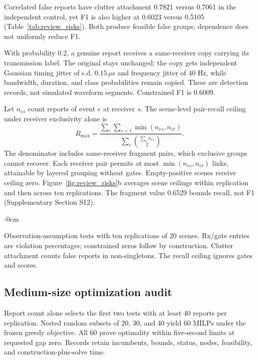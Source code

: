 Correlated false reports have clutter attachment 0.7821 versus 0.7061 in the independent control, yet F1 is also higher at 0.6023 versus 0.5105 (Table~\ref{tab:review_risks}). Both produce feasible false groups; dependence does not uniformly reduce F1.

With probability 0.2, a genuine report receives a same-receiver copy carrying its transmission label. The original stays unchanged; the copy gets independent Gaussian timing jitter of s.d. $0.15\,\mu$s and frequency jitter of 40 Hz, while bandwidth, duration, and class probabilities remain copied. These are detection records, not simulated waveform segments. Constrained F1 is 0.6009.

Let $n_{es}$ count reports of event $e$ at receiver $s$. The scene-level pair-recall ceiling under receiver exclusivity alone is
\[
 R_{\max}=\frac{\sum_e\sum_{s<t}\min(n_{es},n_{et})}
 {\sum_e\binom{\sum_s n_{es}}2}.
\]
The denominator includes same-receiver fragment pairs, which exclusive groups cannot recover. Each receiver pair permits at most $\min(n_{es},n_{et})$ links, attainable by layered grouping without gates. Empty-positive scenes receive ceiling zero. Figure~\ref{fig:review_risks}b averages scene ceilings within replication and then across ten replications. The fragment value 0.6529 bounds recall, not F1 (Supplementary Section S12).

\begin{table}[!t]\begin{adjustwidth}{-\extralength}{0cm}
\caption{Observation-assumption tests with ten replications of 20 scenes. Rx/gate entries are violation percentages; constrained zeros follow by construction. Clutter attachment counts false reports in non-singletons. The recall ceiling ignores gates and scores.}\label{tab:review_risks}
\small\setlength{\tabcolsep}{3pt}
\end{adjustwidth}\end{table}

\subsection{Medium-size optimization audit}\label{sec:medium_exact}
Report count alone selects the first two tests with at least 40 reports per replication. Nested random subsets of 20, 30, and 40 yield 60 MILPs under the frozen greedy objective. All 60 prove optimality within five-second limits at requested gap zero. Records retain incumbents, bounds, status, nodes, feasibility, and construction-plus-solve time.

